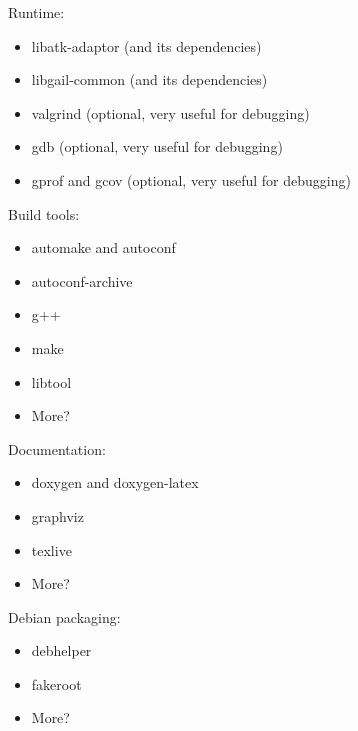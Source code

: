    Runtime:

     \begin{itemize}
        \item libatk-adaptor (and its dependencies)
        \item libgail-common (and its dependencies)
        \item valgrind (optional, very useful for debugging)
        \item gdb (optional, very useful for debugging)
        \item gprof and gcov (optional, very useful for debugging)
     \end{itemize}

   Build tools:

     \begin{itemize}
        \item automake and autoconf
        \item autoconf-archive
        \item g++
        \item make
        \item libtool
        \item More?
     \end{itemize}

   Documentation:

     \begin{itemize}
        \item doxygen and doxygen-latex
        \item graphviz
        \item texlive
        \item More?
     \end{itemize}
      
   Debian packaging:

     \begin{itemize}
        \item debhelper
        \item fakeroot
        \item More?
     \end{itemize}

